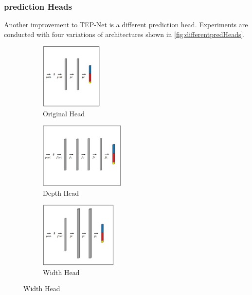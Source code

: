 \subsubsection{prediction Heads}
\label{subsubsec:predictionheads}

Another improvement to \ac{TEP}-Net \cite{tepNet2024} is a different prediction head.
Experiments are conducted with four variations of architectures shown in \autoref{fig:differentpredHeads}.

\begin{figure}[H]
    \centering
    \begin{subfigure}[t]{0.21\textwidth}
        \centering
        \includegraphics[height=3.3cm, keepaspectratio]{PICs/improvedModel/originalHead.jpg}
        \caption{Original Head \cite{tepNet2024}}
        \label{fig:predHeadOriginal}
    \end{subfigure}
    \begin{subfigure}[t]{0.27\textwidth}
        \centering
        \includegraphics[height=3.3cm, keepaspectratio]{PICs/improvedModel/depthHead.jpg}
        \caption{Depth Head}
        \label{fig:predHeadDepth}
    \end{subfigure}
    \begin{subfigure}[t]{0.24\textwidth}
        \centering
        \includegraphics[height=3.3cm, keepaspectratio]{PICs/improvedModel/widthHead.jpg}
        \caption{Width Head}
        \label{fig:predHeadWidth}
    \end{subfigure}

\end{figure}
